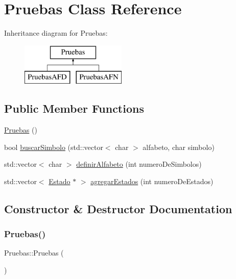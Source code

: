 \hypertarget{class_pruebas}{}\section{Pruebas Class Reference}
\label{class_pruebas}
Inheritance diagram for Pruebas\+:\begin{figure}[H]
\begin{center}
\leavevmode
\includegraphics[height=2.000000cm]{class_pruebas}
\end{center}
\end{figure}
\subsection*{Public Member Functions}
\begin{DoxyCompactItemize}
\item 
\hyperlink{class_pruebas_af78514bc056a28b5477af6b75216364e}{Pruebas} ()
\item 
bool \hyperlink{class_pruebas_ab1eda5c03c5298ba35c48845ff6544eb}{buscar\+Simbolo} (std\+::vector$<$ char $>$ alfabeto, char simbolo)
\item 
std\+::vector$<$ char $>$ \hyperlink{class_pruebas_a4f7adc9be1f1f9ec96d6a713c728f4cc}{definir\+Alfabeto} (int numero\+De\+Simbolos)
\item 
std\+::vector$<$ \hyperlink{class_estado}{Estado} $\ast$ $>$ \hyperlink{class_pruebas_a7d80b5a28534edbf0f92f56e8e423f3e}{agregar\+Estados} (int numero\+De\+Estados)
\end{DoxyCompactItemize}


\subsection{Constructor \& Destructor Documentation}
\mbox{\label{class_pruebas_af78514bc056a28b5477af6b75216364e}} 
\subsubsection{\texorpdfstring{Pruebas()}{Pruebas()}}
{\footnotesize\ttfamily Pruebas\+::\+Pruebas (\begin{DoxyParamCaption}{ }\end{DoxyParamCaption})}

